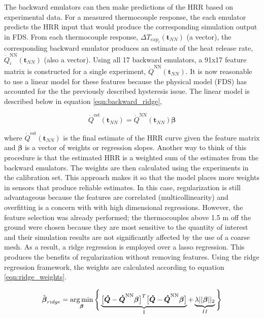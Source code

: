 \documentclass{article}
\begin{document}
The backward emulators can then make predictions of the HRR based on experimental data. For a measured thermocouple response, the each emulator predicts the HRR input that would produce the corresponding simulation output in FDS. From each thermocouple response,  $\Delta T_{exp_i} (\boldsymbol{t}_{NN})$ (a vector), the corresponding backward emulator produces an estimate of the heat release rate, $\Dot{Q}^{\text{NN}}_i (\boldsymbol{t}_{NN})$ (also a vector). Using all 17 backward emulators, a 91x17 feature matrix is constructed for a single experiment, $\Dot{Q}^{\text{NN}} (\boldsymbol{t}_{NN})$. It is now reasonable to use a linear model for these features because the physical model (FDS) has accounted for the the previously described hysteresis issue. The linear model is described below in equation \ref{eqn:backward_ridge}, 

\begin{equation}
  \label{eqn:backward_ridge}
    \Dot{Q}^{\text{est}}(\boldsymbol{t}_{NN}) = \Dot{Q}^{\text{NN}} (\boldsymbol{t}_{NN})\boldsymbol{\beta}
\end{equation}

\noindent where $\Dot{Q}^{\text{est}}(\boldsymbol{t}_{NN})$ is the final estimate of the HRR curve given the feature matrix and $\boldsymbol{\beta}$ is a vector of weights or regression slopes. Another way to think of this procedure is that the estimated HRR is a weighted sum of the estimates from the backward emulators. The weights are then calculated using the experiments in the calibration set. This approach makes it so that the model places more weights in sensors that produce reliable estimates. In this case, regularization is still advantageous because the features are correlated (multicollinearity) and overfitting is a concern with with high dimensional regressions. However, the feature selection was already performed; the thermocouples above 1.5 m off the ground were chosen because they are most sensitive to the quantity of interest and their simulation results are not significantly affected by the use of a coarse mesh. As a result, a ridge regression is employed over a lasso regression. This produces the benefits of regularization without removing features. Using the ridge regression framework, the weights are calculated according to equation \ref{eqn:ridge_weights}.


 \begin{equation}
  \label{eqn:ridge_weights}
  \hat{\boldsymbol{\beta}}_{ridge} = \operatorname*{arg\,min}_{\boldsymbol{\beta}}\Bigg\{ \underbrace{\big[\boldsymbol{\dot{Q}} - \boldsymbol{\Dot{Q}}^{\text{NN}} \boldsymbol{\beta}  \big]^T \big[\boldsymbol{\dot{Q}} - \boldsymbol{\Dot{Q}}^{\text{NN}}\boldsymbol{\beta}\big]}_{\text{I}} + \underbrace{\lambda||\boldsymbol{\beta}||_2}_{II}   \Bigg\}
\end{equation}
\end{document}
